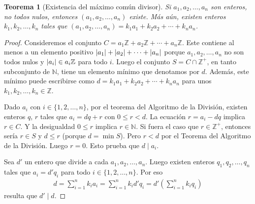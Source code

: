 \documentclass{report}
\newcommand{\naturalNumbers}{\mathbb{N}}
\newcommand{\integerNumbers}{\mathbb{Z}}
\DeclarePairedDelimiter{\abs}{\lvert}{\rvert}
\newtheorem{theorem}{Teorema}
\begin{document}
  \begin{theorem}[Existencia del máximo común divisor]
    Si \(a_1, a_2, \dots, a_n\) son enteros, no todos nulos, entonces \((a_1, a_2, \dots, a_n)\) existe.
    Más aún, existen enteros \(k_1, k_2, \dots, k_n\) tales que \((a_1, a_2, \dots, a_n) = k_1 a_1 + k_2 a_2 + \cdots + k_n a_n\).
  \end{theorem}
  \begin{proof}
    Consideremos el conjunto \(C = a_1 \integerNumbers + a_2 \integerNumbers + \cdots + a_n \integerNumbers\).
    Este contiene al menos a un elemento positivo \(\abs{a_1} + \abs{a_2} + \cdots + \abs{a_n}\) porque \(a_1, a_2, \dots, a_n\) no son todos nulos y \(\abs{a_i} \in a_i \integerNumbers\) para todo \(i\).
    Luego el conjunto \(S = C \cap \integerNumbers^+\), en tanto subconjunto de \(\naturalNumbers\), tiene un elemento mínimo que denotamos por \(d\).
    Además, este mínimo puede escribirse como \(d = k_1 a_1 + k_2 a_2 + \cdots + k_n a_n\) para unos \(k_1, k_2, \dots, k_n \in \integerNumbers\).

    Dado \(a_i\) con \(i \in \{1, 2, \dots, n\}\), por el teorema del Algoritmo de la División, existen enteros \(q\), \(r\) tales que \(a_i = d q + r\) con \(0 \leq r < d\).
    La ecuación \(r = a_i - d q\) implica \(r \in C\).
    Y la desigualdad \(0 \leq r\) implica \(r \in \naturalNumbers\).
    Si fuera el caso que \(r \in \integerNumbers^+\), entonces sería \(r \in S\) y \(d \leq r\) (porque \(d = \min S\)).
    Pero \(r < d\) por el Teorema del Algoritmo de la División.
    Luego \(r = 0\).
    Esto prueba que \(d \mid a_i\).

    Sea \(d'\) un entero que divide a cada \(a_1, a_2, \dots, a_n\).
    Luego existen enteros \(q_1, q_2, \dots, q_n\) tales que \(a_i = d' q_i\) para todo \(i \in \{1, 2, \dots, n\}\).
    Por eso
    \begin{align}
      d
      =
      \sum_{i = 1}^n k_i a_i
      =
      \sum_{i = 1}^n k_i d' q_i
      =
      d' \left( \sum_{i = 1}^n k_i q_i \right)
    \end{align}
    resulta que \(d' \mid d\).
  \end{proof}
\end{document}
